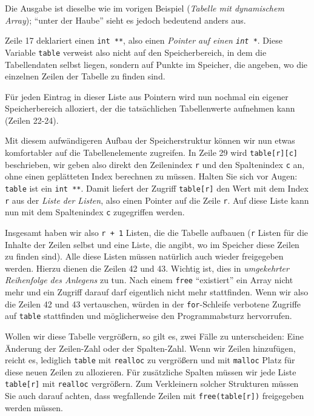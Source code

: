 Die Ausgabe ist dieselbe wie im vorigen Beispiel (\emph{Tabelle mit dynamischem Array}); \enquote{unter der Haube} sieht es jedoch bedeutend anders aus.

Zeile 17 deklariert einen \texttt{int **}, also einen \emph{Pointer auf einen \texttt{int *}}. Diese Variable \texttt{table} verweist also nicht auf den Speicherbereich, in dem die Tabellendaten selbst liegen, sondern auf Punkte im Speicher, die angeben, wo die einzelnen Zeilen der Tabelle zu finden sind.

Für jeden Eintrag in dieser Liste aus Pointern wird nun nochmal ein eigener Speicherbereich alloziert, der die tatsächlichen Tabellenwerte aufnehmen kann (Zeilen 22-24).

Mit diesem aufwändigeren Aufbau der Speicherstruktur können wir nun etwas komfortabler auf die Tabellenelemente zugreifen. In Zeile 29 wird \texttt{table[r][c]} beschrieben, wir geben also direkt den Zeilenindex \texttt{r} und den Spaltenindex \texttt{c} an, ohne einen geplätteten Index berechnen zu müssen. Halten Sie sich vor Augen: \texttt{table} ist ein \texttt{int **}. Damit liefert der Zugriff \texttt{table[r]} den Wert mit dem Index \texttt{r} aus der \emph{Liste der Listen}, also einen Pointer auf die Zeile \texttt{r}. Auf diese Liste kann nun mit dem Spaltenindex \texttt{c} zugegriffen werden.

Insgesamt haben wir also \texttt{r + 1} Listen, die die Tabelle aufbauen (\texttt{r} Listen für die Inhalte der Zeilen selbst und eine Liste, die angibt, wo im Speicher diese Zeilen zu finden sind). Alle diese Listen müssen natürlich auch wieder freigegeben werden. Hierzu dienen die Zeilen 42 und 43. Wichtig ist, dies in \emph{umgekehrter Reihenfolge des Anlegens} zu tun. Nach einem \texttt{free} \enquote{existiert} ein Array nicht mehr und ein Zugriff darauf darf eigentlich nicht mehr stattfinden. Wenn wir also die Zeilen 42 und 43 vertauschen, würden in der \texttt{for}-Schleife verbotene Zugriffe auf \texttt{table} stattfinden und möglicherweise den Programmabsturz hervorrufen.

Wollen wir diese Tabelle vergrößern, so gilt es, zwei Fälle zu unterscheiden: Eine Änderung der Zeilen-Zahl oder der Spalten-Zahl. Wenn wir Zeilen hinzufügen, reicht es, lediglich \texttt{table} mit \texttt{realloc} zu vergrößern und mit \texttt{malloc} Platz für diese neuen Zeilen zu allozieren. Für zusätzliche Spalten müssen wir jede Liste \texttt{table[r]} mit \texttt{realloc} vergrößern. Zum Verkleinern solcher Strukturen müssen Sie auch darauf achten, dass wegfallende Zeilen mit \texttt{free(table[r])} freigegeben werden müssen.

